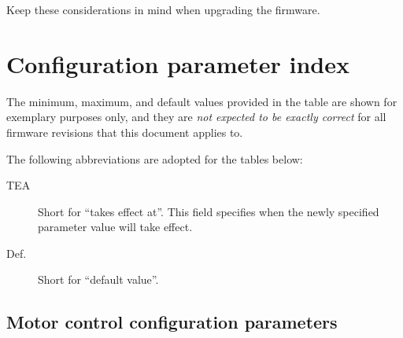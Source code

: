 \documentclass{zubaxdoc}
\newcommand{\CfgDef}[1]{%
    \StrSubstitute{#1}{+}{\textunderscore}[\temp]%
    \texttt{\temp}\label{#1}%
}
\newcounter{CfgReferenceScratchpad}
\newcommand{\CfgListReferences}[1]{%
    \renewcommand*{\do}[1]{%
        \ifnum\theCfgReferenceScratchpad=0%
            \stepcounter{CfgReferenceScratchpad}%
            \else{,\ }%
        \fi%
        \hyperlink{page.##1}{##1}%
    }%
    \dolistcsloop{#1}%
    \setcounter{CfgReferenceScratchpad}{0}%
}
\begin{document}
Keep these considerations in mind when upgrading the firmware.

\section{Configuration parameter index}

The minimum, maximum, and default values provided in the table are shown for exemplary purposes only,
and they are \emph{not expected to be exactly correct} for all firmware revisions that this document applies to.

The following abbreviations are adopted for the tables below:
\begin{description}
\item[TEA] Short for ``takes effect at''. This field specifies when the newly specified parameter value will
take effect.
\item[Def.] Short for ``default value''.
\end{description}

\newcommand\CfgParamIndexEntry[7]{%
    \CfgDef{#1} & \footnotesize{#2} & \footnotesize{\CfgListReferences{#1}} & \footnotesize{#3} &
    \footnotesize{#4} & \footnotesize{#5} & \footnotesize{#6} &
    \footnotesize{#7} \tabularnewline
}%

\newenvironment{CfgParamIndex}[1]{%
    \begin{ZubaxTableWrapper}{#1}
    \setlength\tabcolsep{2.5pt}
    \begin{ZubaxWrappedTable}{@{} l l l l | c c c | X @{}}
    Name & Unit & Pages & TEA & Min & Max & Def. & Note \\
}{%
    \end{ZubaxWrappedTable}
    \end{ZubaxTableWrapper}
}

\subsection{Motor control configuration parameters}
\end{document}
